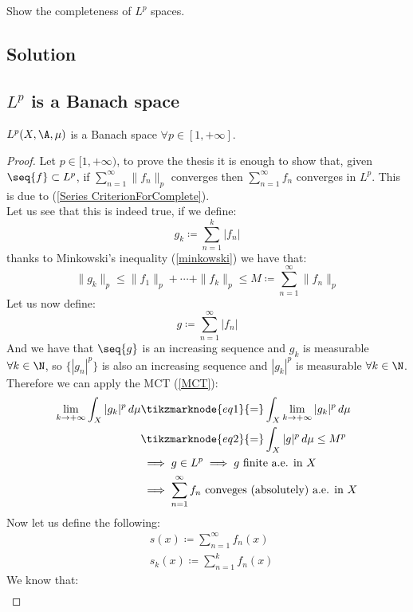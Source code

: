 \question
Show the completeness of $L^p$ spaces.

\subsection*{Solution}

\subsection{\texorpdfstring{$L^p$}{Lp} is a Banach space}
$L^p(X,\A,\mu)$ is a Banach space $\forall p\in[1,+\infty]$.

\begin{proof}
    Let $p\in[1,+\infty)$, to prove the thesis it is enough to show that, given $\seq{f}\subset L^p$, if $\sum_{n=1}^\infty \|f_n\|_p$ converges then $\sum_{n=1}^\infty f_n$ converges in $L^p$. This is due to (\ref{Series CriterionForComplete}).\\
    Let us see that this is indeed true, if we define:
    \[ g_k \coloneqq \sum_{n=1}^k |f_n| \]
    thanks to Minkowski's inequality (\ref{minkowski}) we have that:
    \[ \|g_k\|_p \leq \|f_1\|_p + \cdots + \|f_k\|_p \leq M \coloneqq \sum_{n=1}^\infty \|f_n\|_p \]
    Let us now define:
    \[ g \coloneqq \sum_{n=1}^\infty |f_n|\]
    And we have that $\seq{g}$ is an increasing sequence and $g_k$ is measurable $\forall k\in\N$, so $\{|g_n|^p\}$ is also an increasing sequence and $|g_k|^p$ is measurable $\forall k \in \N$.\\
    Therefore we can apply the MCT (\ref{MCT}):
    \begin{align*}
        \lim_{k\to +\infty} \int_X |g_k|^p \, d\mu &\tikzmarknode{eq1}{=} \int_X \lim_{k\to +\infty} |g_k|^p \, d\mu \\
        &\tikzmarknode{eq2}{=} \int_X |g|^p \, d\mu \leq M^p \\
        & \implies g \in L^p \implies g \text{ finite a.e. in } X \\
        & \implies \sum_{n=1}^\infty f_n \text{ conveges (absolutely) a.e. in } X
    \end{align*}
    Now let us define the following:
    \begin{align*}
        & s(x) \coloneqq \sum_{n=1}^\infty f_n(x) \\
        & s_k(x) \coloneqq \sum_{n=1}^k f_n(x)
    \end{align*}   
    We know that:
    \begin{align*}

\end{align*}
\end{proof}
